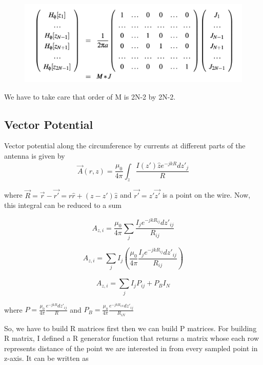 \documentclass[12pt, a4paper]{report}
\begin{document}
\begin{figure}[!tbh]
   	\centering
   	\includegraphics[scale=0.7]{A.png}
 \end{figure} 
 \vspace{0.5cm}
We have to take care that order of M is 2N-2 by 2N-2.
\subsection*{Vector Potential}
Vector potential along the circumference by currents at different parts of the antenna is given by
\begin{equation*}
\vec{A}(r,z) = \frac{\mu_0}{4\pi} \int_z  \frac{I(z')\hat{z} e^{-jkR} dz'_j}{R}
\end{equation*}
 
 where $\vec{R} = \vec{r} - \vec{r'} = r\hat{r} + (z-z')\hat{z}$ and $\vec{r'} = z'\vec{z'}$  is a point on the wire. Now, this integral can be reduced to a sum
 
\begin{equation*}
A_{z,i} = \frac{\mu_0}{4\pi}\sum_{j} ^{} \frac{I_je^{-jkR_{ij}}dz'_{ij}}{R_{ij}}
\end{equation*}

\begin{equation*}
A_{z,i} =\sum_{j} ^{} I_j (  \frac{\mu_0}{4\pi} \frac{I_je^{-jkR_{ij}}dz'_{ij}}{R_{ij}})
\end{equation*}

\begin{equation*}
A_{z,i} =\sum_{j} ^{} I_j P_{ij} + P_BI_N
\end{equation*}


where  
\large
$P = \frac{\mu_0}{4\pi}    \frac{e^{-jkR}dz'_{ij}}{R}$ and $P_B = \frac{\mu_0}{4\pi}    \frac{e^{-jkR_{iN}}dz'_{ij}}{R_{iN}}$
\newpage
\normalsize

So, we have to build R matrices first then we can build P matrices.
For building R matrix, I defined a R generator function that returns a matrix whose each row represents distance of the point we are interested in from every sampled point in z-axis. It can be written as 
\end{document}
